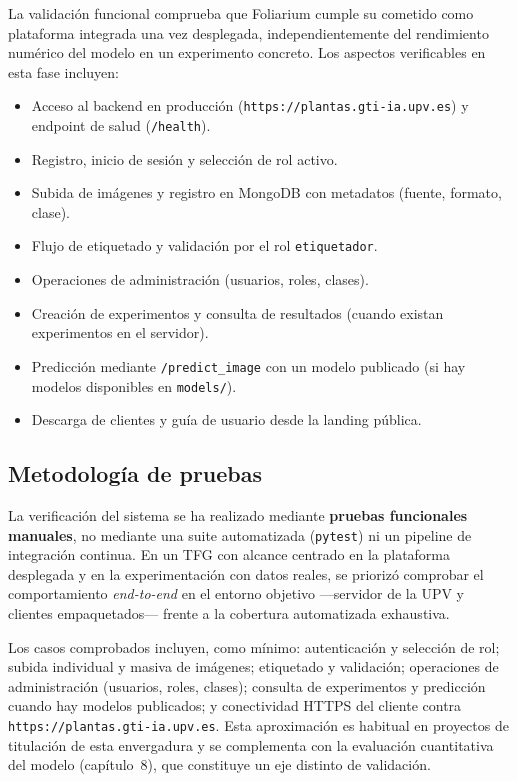 \documentclass[11pt,spanish,listoffigures,listoftables]{tfgetsinf}
\begin{document}
La validación funcional comprueba que Foliarium cumple su cometido como plataforma integrada una vez desplegada, independientemente del rendimiento numérico del modelo en un experimento concreto. Los aspectos verificables en esta fase incluyen:

\begin{itemize}
    \item Acceso al backend en producción (\texttt{https://plantas.gti-ia.upv.es}) y endpoint de salud (\texttt{/health}).
    \item Registro, inicio de sesión y selección de rol activo.
    \item Subida de imágenes y registro en MongoDB con metadatos (fuente, formato, clase).
    \item Flujo de etiquetado y validación por el rol \texttt{etiquetador}.
    \item Operaciones de administración (usuarios, roles, clases).
    \item Creación de experimentos y consulta de resultados (cuando existan experimentos en el servidor).
    \item Predicción mediante \texttt{/predict\_image} con un modelo publicado (si hay modelos disponibles en \texttt{models/}).
    \item Descarga de clientes y guía de usuario desde la landing pública.
\end{itemize}

\subsection{Metodología de pruebas}

La verificación del sistema se ha realizado mediante \textbf{pruebas funcionales manuales}, no mediante una suite automatizada (\texttt{pytest}) ni un pipeline de integración continua. En un TFG con alcance centrado en la plataforma desplegada y en la experimentación con datos reales, se priorizó comprobar el comportamiento \textit{end-to-end} en el entorno objetivo ---servidor de la UPV y clientes empaquetados--- frente a la cobertura automatizada exhaustiva.

Los casos comprobados incluyen, como mínimo: autenticación y selección de rol; subida individual y masiva de imágenes; etiquetado y validación; operaciones de administración (usuarios, roles, clases); consulta de experimentos y predicción cuando hay modelos publicados; y conectividad HTTPS del cliente contra \texttt{https://plantas.gti-ia.upv.es}. Esta aproximación es habitual en proyectos de titulación de esta envergadura y se complementa con la evaluación cuantitativa del modelo (capítulo~8), que constituye un eje distinto de validación.
\end{document}
